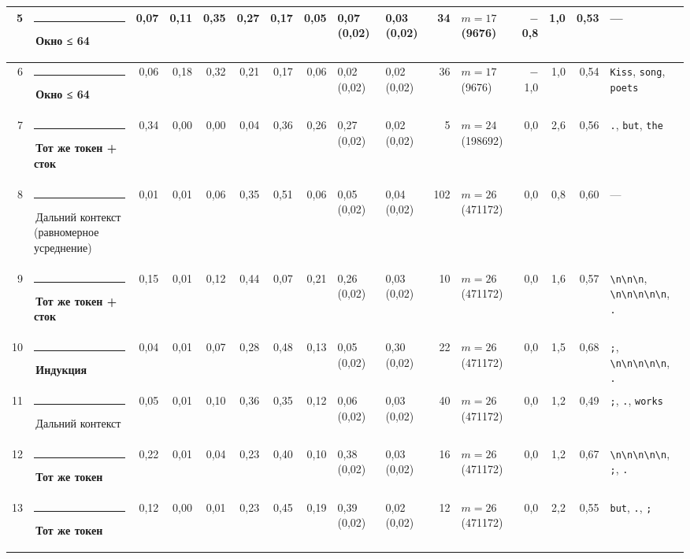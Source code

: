 \documentclass[10pt]{article}
\begin{document}
\begin{minipage}{\linewidth}
\begin{center}
{\begin{tabular}{|r|l|r|r|r|r|r|r|l|l|r|l|r|r|r|l|}
5 & \textcolor[HTML]{EDA100}{\rule{0.62em}{0.62em}}\,\textbf{Окно ≤ 64} & 0,07 & 0,11 & 0,35 & 0,27 & 0,17 & 0,05 & 0,07 (0,02) & 0,03 (0,02) & 34 & $m{=}17$ (9676) & $-$0,8 & 1,0 & 0,53 & — \\ \hline
6 & \textcolor[HTML]{EDA100}{\rule{0.62em}{0.62em}}\,\textbf{Окно ≤ 64} & 0,06 & 0,18 & 0,32 & 0,21 & 0,17 & 0,06 & 0,02 (0,02) & 0,02 (0,02) & 36 & $m{=}17$ (9676) & $-$1,0 & 1,0 & 0,54 & \texttt{\textvisiblespace{}Kiss}, \texttt{\textvisiblespace{}song}, \texttt{\textvisiblespace{}poets} \\ \hline
7 & \textcolor[HTML]{E87BA4}{\rule{0.62em}{0.62em}}\,\textbf{Тот же токен + сток} & 0,34 & 0,00 & 0,00 & 0,04 & 0,36 & 0,26 & 0,27 (0,02) & 0,02 (0,02) & 5 & $m{=}24$ (198692) & 0,0 & 2,6 & 0,56 & \texttt{\textvisiblespace{}.}, \texttt{\textvisiblespace{}but}, \texttt{\textvisiblespace{}the} \\ \hline
8 & \textcolor[HTML]{C3C2B7}{\rule{0.62em}{0.62em}}\,Дальний контекст (равномерное усреднение) & 0,01 & 0,01 & 0,06 & 0,35 & 0,51 & 0,06 & 0,05 (0,02) & 0,04 (0,02) & 102 & $m{=}26$ (471172) & 0,0 & 0,8 & 0,60 & — \\ \hline
9 & \textcolor[HTML]{E87BA4}{\rule{0.62em}{0.62em}}\,\textbf{Тот же токен + сток} & 0,15 & 0,01 & 0,12 & 0,44 & 0,07 & 0,21 & 0,26 (0,02) & 0,03 (0,02) & 10 & $m{=}26$ (471172) & 0,0 & 1,6 & 0,57 & \texttt{\textvisiblespace{}\textbackslash{}n\textbackslash{}n\textbackslash{}n}, \texttt{\textbackslash{}n\textbackslash{}n\textbackslash{}n\textbackslash{}n\textbackslash{}n}, \texttt{\textvisiblespace{}.} \\ \hline
10 & \textcolor[HTML]{008300}{\rule{0.62em}{0.62em}}\,\textbf{Индукция} & 0,04 & 0,01 & 0,07 & 0,28 & 0,48 & 0,13 & 0,05 (0,02) & 0,30 (0,02) & 22 & $m{=}26$ (471172) & 0,0 & 1,5 & 0,68 & \texttt{\textvisiblespace{};}, \texttt{\textbackslash{}n\textbackslash{}n\textbackslash{}n\textbackslash{}n\textbackslash{}n}, \texttt{\textvisiblespace{}.} \\ \hline
11 & \textcolor[HTML]{C3C2B7}{\rule{0.62em}{0.62em}}\,Дальний контекст & 0,05 & 0,01 & 0,10 & 0,36 & 0,35 & 0,12 & 0,06 (0,02) & 0,03 (0,02) & 40 & $m{=}26$ (471172) & 0,0 & 1,2 & 0,49 & \texttt{\textvisiblespace{};}, \texttt{\textvisiblespace{}.}, \texttt{\textvisiblespace{}works} \\ \hline
12 & \textcolor[HTML]{E87BA4}{\rule{0.62em}{0.62em}}\,\textbf{Тот же токен} & 0,22 & 0,01 & 0,04 & 0,23 & 0,40 & 0,10 & 0,38 (0,02) & 0,03 (0,02) & 16 & $m{=}26$ (471172) & 0,0 & 1,2 & 0,67 & \texttt{\textbackslash{}n\textbackslash{}n\textbackslash{}n\textbackslash{}n\textbackslash{}n}, \texttt{\textvisiblespace{};}, \texttt{\textvisiblespace{}.} \\ \hline
13 & \textcolor[HTML]{E87BA4}{\rule{0.62em}{0.62em}}\,\textbf{Тот же токен} & 0,12 & 0,00 & 0,01 & 0,23 & 0,45 & 0,19 & 0,39 (0,02) & 0,02 (0,02) & 12 & $m{=}26$ (471172) & 0,0 & 2,2 & 0,55 & \texttt{\textvisiblespace{}but}, \texttt{\textvisiblespace{}.}, \texttt{\textvisiblespace{};} \\ \hline
\hline\end{tabular}}\end{center}
\end{minipage}
\end{document}
